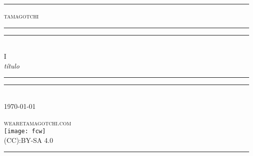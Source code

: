 
\begin{titlepage}
\centering
\settowidth{\unitlength}{\LARGE WE ARE TAMAGOTCHI}

\rule{\unitlength}{0.4pt}

\vspace*{\baselineskip}

{\LARGE\scshape tamagotchi}\\[\baselineskip]

\rule{\unitlength}{1.6pt}\vspace*{-\baselineskip}\vspace*{2pt}
\rule{\unitlength}{0.4pt}\\[\baselineskip]

{\LARGE I}\\[\baselineskip]

{\itshape título}\\[0.2\baselineskip]

\rule{\unitlength}{0.4pt}\vspace*{-\baselineskip}\vspace{3.2pt}
\rule{\unitlength}{1.6pt}\\[\baselineskip]

{\large\scshape \today}\par

\vfill

{\large\scshape wearetamagotchi.com}\\[\baselineskip]

\vspace*{0.5\baselineskip}
\texttt{[image: fcw]}\\
\vspace*{0.5\baselineskip}
{\small\scshape (CC):BY-SA 4.0}\par

\rule{\unitlength}{0.4pt}

\end{titlepage}